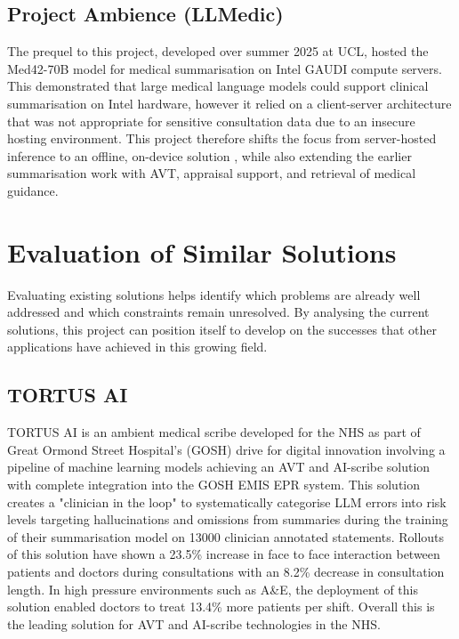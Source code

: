 \subsection{Project Ambience (LLMedic)}
The prequel to this project, developed over summer 2025 at UCL, hosted the Med42-70B model for medical summarisation on Intel GAUDI compute servers\cite{intel_gaudi3_2025}. This demonstrated that large medical language models could support clinical summarisation on Intel hardware, however it relied on a client-server architecture that was not appropriate for sensitive consultation data due to an insecure hosting environment. This project therefore shifts the focus from server-hosted inference to an offline, on-device solution \cite{intel_openvino_gaudi_aipc_2024}, while also extending the earlier summarisation work with AVT, appraisal support, and retrieval of medical guidance.

\section{Evaluation of Similar Solutions}
Evaluating existing solutions helps identify which problems are already well addressed and which constraints remain unresolved. By analysing the current solutions, this project can position itself to develop on the successes that other applications have achieved in this growing field. 

\subsection{TORTUS AI}
TORTUS AI is an ambient medical scribe developed for the NHS as part of Great Ormond Street Hospital's (GOSH) drive for digital innovation involving a pipeline of machine learning models achieving an AVT and AI-scribe solution with complete integration into the GOSH EMIS EPR system\cite{tortus_product_2026}. This solution creates a "clinician in the loop" to systematically categorise LLM errors into risk levels targeting hallucinations and omissions from summaries during the training of their summarisation model on 13000 clinician annotated statements\cite{tortus_creola_2026}. Rollouts of this solution have shown a 23.5\% increase in face to face interaction between patients and doctors during consultations with an 8.2\% decrease in consultation length\cite{gosh_implementing_ai_2025}. In high pressure environments such as A\&E, the deployment of this solution enabled doctors to treat 13.4\% more patients per shift\cite{nia_tortus_2025}. Overall this is the leading solution for AVT and AI-scribe technologies in the NHS.

